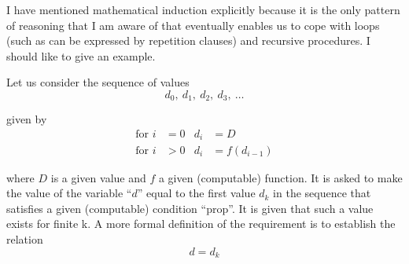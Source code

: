 I have mentioned mathematical induction explicitly because it is the only pattern of reasoning that I am aware of that eventually enables us to cope with loops (such as can be expressed by repetition clauses) and recursive procedures. I should like to give an example.

Let us consider the sequence of values
\begin{equation}
	\label{eq:induction-d}
	d_0,\ d_1,\ d_2,\ d_3,\ \dotso
\end{equation}

\noindent
given by
\begin{subequations}
\begin{align}
\text{for } i &= 0 & d_i &= D \\
\text{for } i &> 0 & d_i &= f(d_{i-1})
\end{align}
\end{subequations}

\noindent
where $D$ is a given value and $f$ a given (computable) function. It is asked to make the value of the variable ``$d$'' equal to the first value $d_k$ in the sequence that satisfies a given (computable) condition ``prop''. It is given that such a value exists for finite k. A more formal definition of the requirement is to establish the relation
\begin{equation}
	d=d_k
\end{equation}

